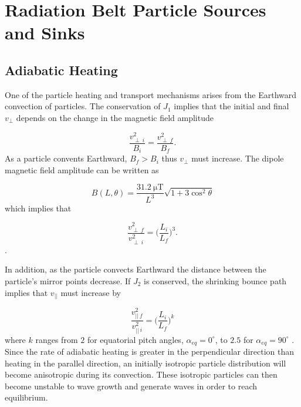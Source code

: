 \section{Radiation Belt Particle Sources and Sinks}\label{Intro:sources_sinks}

\subsection{Adiabatic Heating}\label{Intro:adiabatic_heating}
One of the particle heating and transport mechanisms arises from the Earthward convection of particles. The conservation of $J_1$ implies that the initial and final $v_\perp$ depends on the change in the magnetic field amplitude

\begin{equation}
\frac{v^2_{\perp \ i}}{B_i} = \frac{v^2_{\perp \ f}}{B_f}.
\end{equation} As a particle convents Earthward, $B_f > B_i$ thus $v_\perp$ must increase. The dipole magnetic field amplitude can be written as

\begin{equation}
B(L, \theta) = \frac{31.2 \ \mathrm{\mu T}}{L^3}\sqrt{1 + 3 \cos^2 \theta}
\end{equation} which implies that 

\begin{equation}
\frac{v_{\perp \ f}^2}{v_{\perp \ i}^2} = \bigg( \frac{L_i}{L_f} \bigg)^3.
\end{equation}.

In addition, as the particle convects Earthward the distance between the particle's mirror points decrease. If $J_2$ is conserved, the shrinking bounce path implies that $v_{||}$ must increase by 

\begin{equation}
\frac{v_{|| \ f}^2}{v_{|| \ i}^2} = \bigg( \frac{L_i}{L_f} \bigg)^k
\end{equation} where $k$ ranges from $2$ for equatorial pitch angles, $\alpha_{eq} = 0^\circ$, to $2.5$ for $\alpha_{eq} = 90^\circ$ \citep{Baumjohann1997}. Since the rate of adiabatic heating is greater in the perpendicular direction than heating in the parallel direction, an initially isotropic particle distribution will become anisotropic during its convection. These isotropic particles can then become unstable to wave growth and generate waves in order to reach equilibrium.


